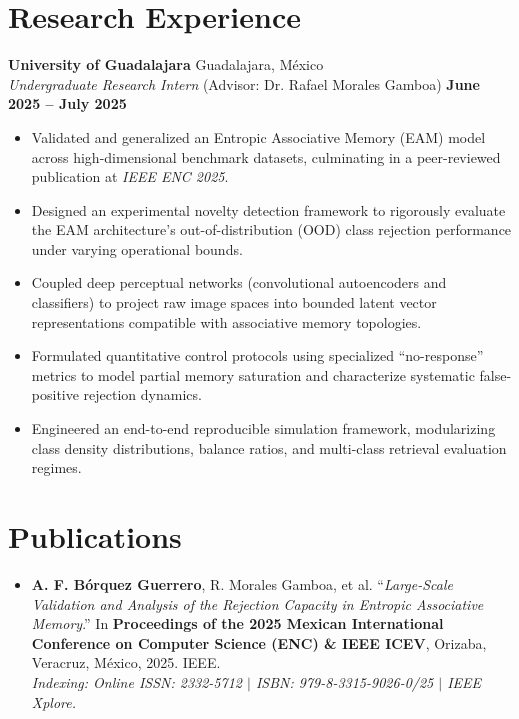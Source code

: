 \documentclass[11pt]{article}
\begin{document}
\section*{Research Experience}
\textbf{University of Guadalajara} \hfill Guadalajara, México \\
\textit{Undergraduate Research Intern} (Advisor: Dr. Rafael Morales Gamboa) \hfill \textbf{June 2025 -- July 2025}
\vspace{-0.3cm}
\begin{itemize}[leftmargin=*]
    \item Validated and generalized an Entropic Associative Memory (EAM) model across high-dimensional benchmark datasets, culminating in a peer-reviewed publication at \textit{IEEE ENC 2025}.

    \vspace{-0.3cm}
    \item Designed an experimental novelty detection framework to rigorously evaluate the EAM architecture's out-of-distribution (OOD) class rejection performance under varying operational bounds.

    \vspace{-0.3cm}
    \item Coupled deep perceptual networks (convolutional autoencoders and classifiers) to project raw image spaces into bounded latent vector representations compatible with associative memory topologies.

    \vspace{-0.3cm}
    \item Formulated quantitative control protocols using specialized ``no-response'' metrics to model partial memory saturation and characterize systematic false-positive rejection dynamics.

    \vspace{-0.3cm}
    \item Engineered an end-to-end reproducible simulation framework, modularizing class density distributions, balance ratios, and multi-class retrieval evaluation regimes.
\end{itemize}



\section*{Publications}
\begin{itemize}[leftmargin=*]
    \item \textbf{A. F. Bórquez Guerrero}, R. Morales Gamboa, et al. ``\textit{Large-Scale Validation and Analysis of the Rejection Capacity in Entropic Associative Memory}.'' In \textbf{Proceedings of the 2025 Mexican International Conference on Computer Science (ENC) \& IEEE ICEV}, Orizaba, Veracruz, México, 2025. IEEE. \\
    \footnotesize\textit{Indexing: Online ISSN: 2332-5712 $\vert$ ISBN: 979-8-3315-9026-0/25 $\vert$ IEEE Xplore.}
\end{itemize}
\end{document}
